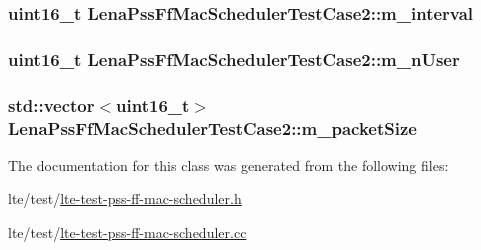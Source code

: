 \subsubsection[{\texorpdfstring{m\+\_\+interval}{m_interval}}]{\setlength{\rightskip}{0pt plus 5cm}uint16\+\_\+t Lena\+Pss\+Ff\+Mac\+Scheduler\+Test\+Case2\+::m\+\_\+interval\hspace{0.3cm}{\ttfamily [private]}}\hypertarget{classLenaPssFfMacSchedulerTestCase2_a80853226f76f2201046d2e6c799680ac}{}\label{classLenaPssFfMacSchedulerTestCase2_a80853226f76f2201046d2e6c799680ac}
\subsubsection[{\texorpdfstring{m\+\_\+n\+User}{m_nUser}}]{\setlength{\rightskip}{0pt plus 5cm}uint16\+\_\+t Lena\+Pss\+Ff\+Mac\+Scheduler\+Test\+Case2\+::m\+\_\+n\+User\hspace{0.3cm}{\ttfamily [private]}}\hypertarget{classLenaPssFfMacSchedulerTestCase2_a4d4431bc9cfea75e5f20c9aec63b97fe}{}\label{classLenaPssFfMacSchedulerTestCase2_a4d4431bc9cfea75e5f20c9aec63b97fe}
\subsubsection[{\texorpdfstring{m\+\_\+packet\+Size}{m_packetSize}}]{\setlength{\rightskip}{0pt plus 5cm}std\+::vector$<$uint16\+\_\+t$>$ Lena\+Pss\+Ff\+Mac\+Scheduler\+Test\+Case2\+::m\+\_\+packet\+Size\hspace{0.3cm}{\ttfamily [private]}}\hypertarget{classLenaPssFfMacSchedulerTestCase2_a91fce939c11d7abd86121e57485d8027}{}\label{classLenaPssFfMacSchedulerTestCase2_a91fce939c11d7abd86121e57485d8027}


The documentation for this class was generated from the following files\+:\begin{DoxyCompactItemize}
\item 
lte/test/\hyperlink{lte-test-pss-ff-mac-scheduler_8h}{lte-\/test-\/pss-\/ff-\/mac-\/scheduler.\+h}\item 
lte/test/\hyperlink{lte-test-pss-ff-mac-scheduler_8cc}{lte-\/test-\/pss-\/ff-\/mac-\/scheduler.\+cc}\end{DoxyCompactItemize}
